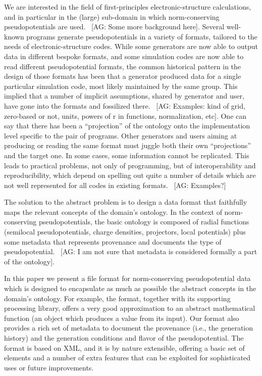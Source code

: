 \documentclass[prb,showpacs,superscriptaddress]{revtex4-1}
\newcommand{\AG}[1]{{\color{red}~\textsf{[AG: #1]}}}
\begin{document}
We are interested in the field of first-principles electronic-structure
calculations, and in particular in the (large) sub-domain in which
norm-conserving pseudopotentials are used. \AG{Some more background here}.
%
Several well-known programs generate pseudopotentials in a variety of
formats, tailored to the needs of electronic-structure codes. While
some generators are now able to output data in different bespoke
formats, and some simulation codes are now able to read different
pseudopotential formats, the common historical pattern in the design
of those formats has been that a generator produced data for a single
particular simulation code, most likely maintained by the same
group. This implied that a number of implicit assumptions, shared by
generator and user, have gone into the formats and fossilized there.
\AG{Examples: kind of grid, zero-based or not, units, powers of r in
  functions, normalization, etc}. 
%
One can say that there has been a ``projection'' of
the ontology onto the implementation level specific to the pair of
programs. Other generators and users aiming at producing or reading
the same format must juggle both their own ``projections'' and the target
one. In some cases, some information cannot be replicated.
%
This leads to practical problems, not only of programming, but of
interoperability and reproducibility, which depend on spelling
out quite a number of details which are not well
represented for all codes in existing formats. \AG{Examples?}

The solution to the abstract problem is to design a data format that faithfully maps the
relevant concepts of the domain's ontology. In the context of
norm-conserving pseudopotentials, the basic ontology is composed of
radial functions (semilocal pseudopotentials, charge densities,
projectors, local potentials) plus some metadata that represents
provenance and documents the type of pseudopotential. \AG{I am not
  sure that metadata is considered formally a part of the ontology}.

In this paper we present a file format for norm-conserving
pseudopotential data which is designed to encapsulate as much as
possible the abstract concepts in the domain's ontology. For example,
the format, together with its supporting processing library, offers a
very good approximation to an abstract mathematical function (an
object which produces a value from its input).
%
Our format also provides a rich set of metadata to document the
provenance (i.e., the generation history) and the generation
conditions and flavor of the pseudopotential.
%
The format is based on XML, and it is by nature extensible, offering a
basic set of elements and a number of extra features that can be
exploited for sophisticated uses or future improvements.
\end{document}
